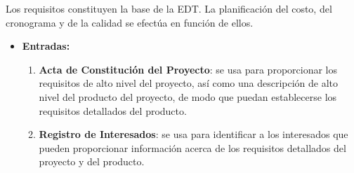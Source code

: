 \documentclass[10pt,a4paper]{article}
\begin{document}
Los requisitos constituyen la base de la EDT. La planificación del costo, del cronograma y de la calidad se efectúa en función de ellos.
\begin{itemize}
\item \textbf{Entradas:}
\begin{enumerate}
\item \textbf{Acta de Constitución del Proyecto}: se usa para proporcionar los requisitos de alto nivel del proyecto, así como una descripción de alto nivel del producto del proyecto, de modo que puedan establecerse los requisitos detallados del producto.
\item \textbf{Registro de Interesados}: se usa para identificar a los interesados que pueden proporcionar información acerca de los requisitos detallados del proyecto y del producto.
\end{enumerate}


\end{itemize}
\end{document}
